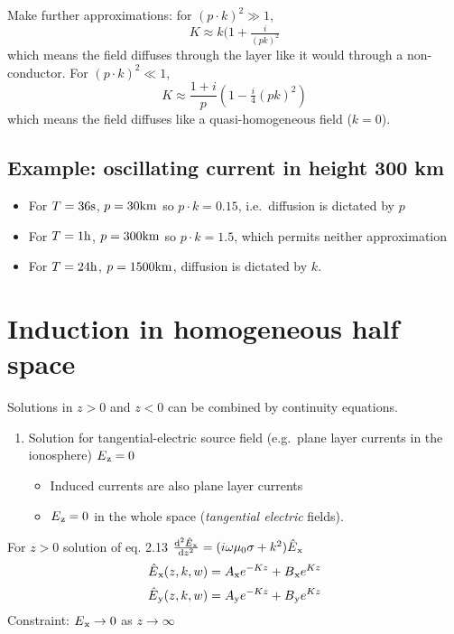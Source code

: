 Make further approximations: for \((p\cdot k)^2 \gg 1\), \[
  K \approx k(1+\tfrac{i}{(pk)^2}
\] which means the field diffuses through the layer like it would
through a non-conductor. For \((p\cdot k)^2 \ll 1\), \[
  K \approx \frac{1+i}{p}(1 - \tfrac{i}4(pk)^2)
\] which means the field diffuses like a quasi-homogeneous field
(\(k=0\)).

\subsection{Example: oscillating current in height 300
km}\label{example-oscillating-current-in-height-300-km}

\begin{itemize}
\tightlist
\item
  For \(T = 36\mathrm{s}\), \(p = 30\mathrm{km}\) so \(p\cdot k = 0.15\),
  i.e.~diffusion is dictated by \(p\)
\item
  For \(T = 1\mathrm{h}\), \(p = 300\mathrm{km}\) so \(p\cdot k = 1.5\),
  which permits neither approximation
\item
  For \(T = 24\mathrm{h}\), \(p = 1500\mathrm{km}\), diffusion is dictated
  by \(k\).
\end{itemize}

\section{Induction in homogeneous half
space}\label{induction-in-homogeneous-half-space}

Solutions in \(z>0\) and \(z<0\) can be combined by continuity
equations.

\begin{enumerate}
\def\labelenumi{\arabic{enumi}.}
\tightlist
\item
  Solution for tangential-electric source field (e.g.~plane layer
  currents in the ionosphere) \(E\text{$_{\mathrm{z}}$}=0\)

  \begin{itemize}
  \tightlist
  \item
    Induced currents are also plane layer currents
  \item
    \(E\text{$_{\mathrm{z}}$} = 0\) in the whole space (\emph{tangential electric}
    fields).
  \end{itemize}
\end{enumerate}

For \(z>0\) solution of eq. 2.13
\(\frac{\mathrm{d}^2\hat{E}\text{$_{\mathrm{x}}$}}{\mathrm{d} z^2} = (i\omega\mu_0\sigma + k^2)\hat{E}\text{$_{\mathrm{x}}$}\)
\[
  \hat{E}\text{$_{\mathrm{x}}$}(z,k,w) = A\text{$_{\mathrm{x}}$} e^{-Kz} + B\text{$_{\mathrm{x}}$}e^{Kz}
\] \[
  \hat{E}\text{$_{\mathrm{y}}$}(z,k,w) = A\text{$_{\mathrm{y}}$} e^{-Kz} + B\text{$_{\mathrm{y}}$}e^{Kz}
\] Constraint: \(E\text{$_{\mathrm{x}}$}\to 0\) as \(z \to\infty\)

